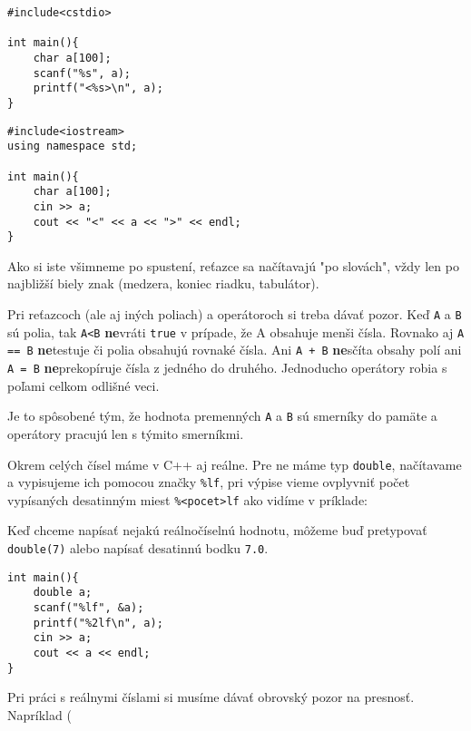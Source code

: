 \begin{lstlisting}
#include<cstdio>

int main(){
    char a[100];
    scanf("%s", a);
    printf("<%s>\n", a);
}
\end{lstlisting}
\begin{lstlisting}
#include<iostream>
using namespace std;

int main(){
    char a[100];
    cin >> a;
    cout << "<" << a << ">" << endl;
}
\end{lstlisting}

Ako si iste všimneme po spustení, reťazce sa načítavajú "po slovách",
vždy len po najbližší biely znak (medzera, koniec riadku, tabulátor).

\medskip

Pri reťazcoch (ale aj iných poliach) a operátoroch si treba dávať pozor.  Keď
\verb!A! a \verb!B! sú polia, tak \verb!A<B! \textbf{ne}vráti \verb!true! v
prípade, že A obsahuje menši čísla. Rovnako aj \verb!A == B! \textbf{ne}testuje
či polia obsahujú rovnaké čísla. Ani \verb!A + B! \textbf{ne}sčíta obsahy polí
ani \verb!A = B!  \textbf{ne}prekopíruje čísla z jedného do druhého. Jednoducho
operátory robia s poľami celkom odlišné veci.

Je to spôsobené tým, že hodnota premenných \verb!A! a \verb!B! sú smerníky do
pamäte a operátory pracujú len s týmito smerníkmi.


Okrem celých čísel máme v C++ aj reálne. Pre ne máme typ
\verb!double!, načítavame a vypisujeme ich pomocou značky \verb"%lf",
pri výpise vieme ovplyvniť počet vypísaných desatinným miest \verb"%<pocet>lf"
ako vidíme v príklade:

Keď chceme napísať nejakú reálnočíselnú hodnotu, môžeme buď pretypovať
\verb!double(7)! alebo napísať desatinnú bodku \verb!7.0!.

\begin{lstlisting}
int main(){
    double a;
    scanf("%lf", &a);
    printf("%2lf\n", a);
    cin >> a;
    cout << a << endl;
}
\end{lstlisting}

\medskip

Pri práci s reálnymi číslami si musíme dávať obrovský pozor na presnosť.
Napríklad ( 












